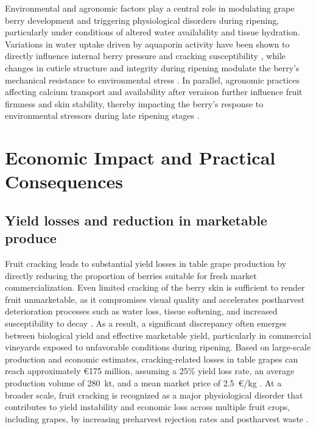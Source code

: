\noindent
Environmental and agronomic factors play a central role in modulating grape berry development and triggering physiological disorders during ripening, particularly under conditions of altered water availability and tissue hydration. Variations in water uptake driven by aquaporin activity have been shown to directly influence internal berry pressure and cracking susceptibility \parencite{YU20251506}, while changes in cuticle structure and integrity during ripening modulate the berry’s mechanical resistance to environmental stress \parencite{plants13172400}. In parallel, agronomic practices affecting calcium transport and availability after veraison further influence fruit firmness and skin stability, thereby impacting the berry’s response to environmental stressors during late ripening stages \parencite{horticulturae11111320}.



\section{Economic Impact and Practical Consequences}
\label{sec:economic_impact}

\subsection{Yield losses and reduction in marketable produce}

\noindent
Fruit cracking leads to substantial yield losses in table grape production by directly reducing the proportion of berries suitable for fresh market commercialization. Even limited cracking of the berry skin is sufficient to render fruit unmarketable, as it compromises visual quality and accelerates postharvest deterioration processes such as water loss, tissue softening, and increased susceptibility to decay \parencite{plants14162462}. As a result, a significant discrepancy often emerges between biological yield and effective marketable yield, particularly in commercial vineyards exposed to unfavorable conditions during ripening. Based on large-scale production and economic estimates, cracking-related losses in table grapes can reach approximately €175 million, assuming a 25\% yield loss rate, an average production volume of 280~kt, and a mean market price of 2.5~€/kg \parencite{CrackSense2022}. At a broader scale, fruit cracking is recognized as a major physiological disorder that contributes to yield instability and economic loss across multiple fruit crops, including grapes, by increasing preharvest rejection rates and postharvest waste \parencite{santos2023molecular}.



